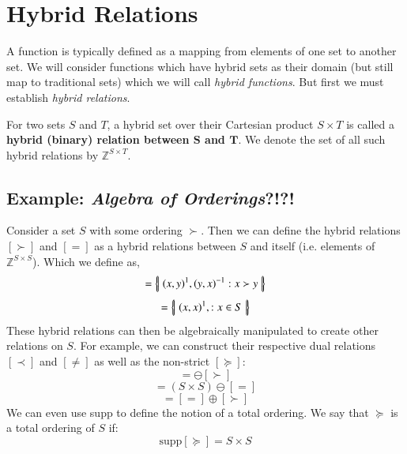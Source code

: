 %
%
\section{Hybrid Relations}


A function is typically defined as a mapping from elements of one set to another set.
We will consider functions which have hybrid sets as their domain (but still map to traditional sets) 
which we will call \emph{hybrid functions}.
But first we must establish \emph{hybrid relations}.

\begin{definition}
	For two sets $S$ and $T$, a hybrid set over their Cartesian product $S \times T$ is called a 
	\textbf{hybrid (binary) relation between $\boldsymbol{S}$ and $\boldsymbol{T}$}.
	We denote the set of all such hybrid relations by $\mathbb{Z}^{S \times T}$. 
\end{definition}


\subsection{Example: \emph{Algebra of Orderings}?!?!}
Consider a set $S$ with some ordering $\succ$.
Then we can define the hybrid relations $[\succ]$ and $[=]$ as a hybrid relations between $S$ and itself 
(i.e. elements of $\mathbb{Z}^{S\times S}$).
Which we define as,
\begin{equation}
	[\succ] = \hset{ (x,y)^1, (y,x)^{-1} : x \succ y }
\end{equation}
\begin{equation}
	[=] = \hset{ (x,x)^1, : x \in S }
\end{equation}
These hybrid relations can then be algebraically manipulated to create other relations on $S$.
For example, we can construct their respective dual relations $[\prec]$ and $[\neq]$ as well as the non-strict $[\succeq]$:
\begin{equation}
	[\prec] = \ominus [\succ]
\end{equation}
\begin{equation}
	[\neq] = (S\times S) \ominus [=]
\end{equation}
\begin{equation}
	[\succeq] = [=] \oplus [\succ]
\end{equation}
We can even use supp to define the notion of a total ordering.
We say that $\succeq$ is a total ordering of $S$ if:
\begin{equation}
	\text{supp}[\succeq] = S \times S
\end{equation}

